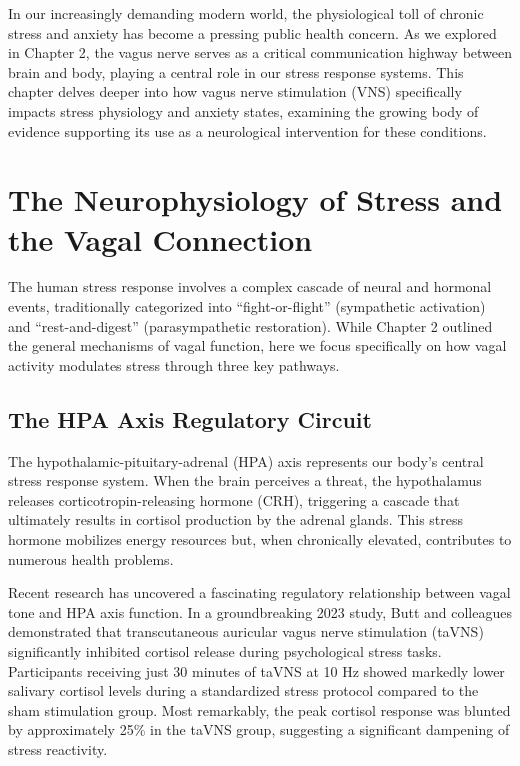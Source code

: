 \documentclass[
  Letterpaper,
]{scrbook}
\begin{document}
In our increasingly demanding modern world, the physiological toll of
chronic stress and anxiety has become a pressing public health concern.
As we explored in Chapter 2, the vagus nerve serves as a critical
communication highway between brain and body, playing a central role in
our stress response systems. This chapter delves deeper into how vagus
nerve stimulation (VNS) specifically impacts stress physiology and
anxiety states, examining the growing body of evidence supporting its
use as a neurological intervention for these conditions.

\section{The Neurophysiology of Stress and the Vagal
Connection}\label{the-neurophysiology-of-stress-and-the-vagal-connection}

The human stress response involves a complex cascade of neural and
hormonal events, traditionally categorized into ``fight-or-flight''
(sympathetic activation) and ``rest-and-digest'' (parasympathetic
restoration). While Chapter 2 outlined the general mechanisms of vagal
function, here we focus specifically on how vagal activity modulates
stress through three key pathways.

\subsection{The HPA Axis Regulatory
Circuit}\label{the-hpa-axis-regulatory-circuit}

The hypothalamic-pituitary-adrenal (HPA) axis represents our body's
central stress response system. When the brain perceives a threat, the
hypothalamus releases corticotropin-releasing hormone (CRH), triggering
a cascade that ultimately results in cortisol production by the adrenal
glands. This stress hormone mobilizes energy resources but, when
chronically elevated, contributes to numerous health problems.

Recent research has uncovered a fascinating regulatory relationship
between vagal tone and HPA axis function. In a groundbreaking 2023
study, Butt and colleagues demonstrated that transcutaneous auricular
vagus nerve stimulation (taVNS) significantly inhibited cortisol release
during psychological stress tasks. Participants receiving just 30
minutes of taVNS at 10 Hz showed markedly lower salivary cortisol levels
during a standardized stress protocol compared to the sham stimulation
group. Most remarkably, the peak cortisol response was blunted by
approximately 25\% in the taVNS group, suggesting a significant
dampening of stress reactivity.
\end{document}
